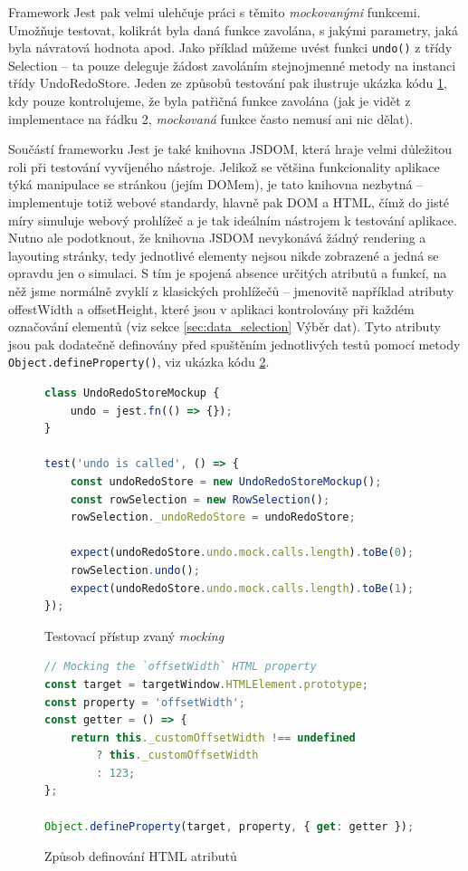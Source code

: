 \documentclass[thesis=B,czech]{FITthesis}[2012/06/26]
\begin{document}
Framework Jest pak velmi ulehčuje práci s těmito \emph{mockovanými} funkcemi. Umožňuje testovat, kolikrát byla daná funkce zavolána, s jakými parametry, jaká byla návratová hodnota apod. Jako příklad můžeme uvést funkci \verb|undo()| z třídy Selection -- ta pouze deleguje žádost zavoláním stejnojmenné metody na instanci třídy UndoRedoStore. Jeden ze způsobů testování pak ilustruje ukázka kódu \ref{code:mocking}, kdy pouze kontrolujeme, že byla patřičná funkce zavolána (jak je vidět z implementace na řádku 2, \emph{mockovaná} funkce často nemusí ani nic dělat).

Součástí frameworku Jest je také knihovna JSDOM, která hraje velmi důležitou roli při testování vyvíjeného nástroje. Jelikož se většina funkcionality aplikace týká manipulace se stránkou (jejím DOMem), je tato knihovna nezbytná -- implementuje totiž webové standardy, hlavně pak DOM a HTML, čímž do jisté míry simuluje webový prohlížeč a je tak ideálním nástrojem k testování aplikace. Nutno ale podotknout, že knihovna JSDOM nevykonává žádný rendering a layouting stránky, tedy jednotlivé elementy nejsou nikde zobrazené a jedná se opravdu jen o simulaci. S tím je spojená absence určitých atributů a funkcí, na něž jsme normálně zvyklí z klasických prohlížečů -- jmenovitě například atributy \textsf{offestWidth} a \textsf{offsetHeight}, které jsou v aplikaci kontrolovány při každém označování elementů (viz sekce \ref{sec:data_selection} Výběr dat). Tyto atributy jsou pak dodatečně definovány před spuštěním jednotlivých testů pomocí metody \verb|Object.defineProperty()|, viz ukázka kódu \ref{code:setup}.

\begin{figure}
	\begin{lstlisting}[language=JavaScript]
class UndoRedoStoreMockup {
	undo = jest.fn(() => {});
}
	
test('undo is called', () => {
	const undoRedoStore = new UndoRedoStoreMockup();
	const rowSelection = new RowSelection();
	rowSelection._undoRedoStore = undoRedoStore;
	
	expect(undoRedoStore.undo.mock.calls.length).toBe(0);
	rowSelection.undo();
	expect(undoRedoStore.undo.mock.calls.length).toBe(1);
});
	\end{lstlisting}
	\caption{Testovací přístup zvaný \emph{mocking}}
	\label{code:mocking}
\end{figure}

\begin{figure}
	\begin{lstlisting}[language=JavaScript]
// Mocking the `offsetWidth` HTML property
const target = targetWindow.HTMLElement.prototype;
const property = 'offsetWidth';
const getter = () => {
	return this._customOffsetWidth !== undefined 
		? this._customOffsetWidth 
		: 123;
};

Object.defineProperty(target, property, { get: getter });
	\end{lstlisting}
	\caption{Způsob definování HTML atributů}
	\label{code:setup}
\end{figure}
\end{document}
